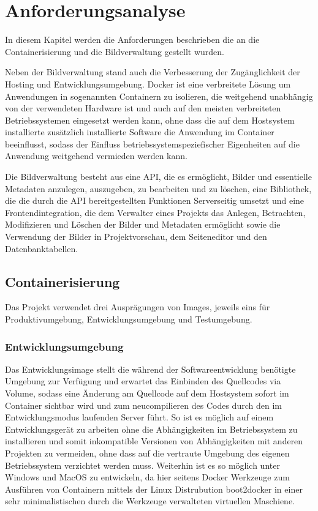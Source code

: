 \section{Anforderungsanalyse}
\label{sec:requirements}

In diesem Kapitel werden die Anforderungen beschrieben die an die
Containerisierung und die Bildverwaltung gestellt wurden.

Neben der Bildverwaltung stand auch die Verbesserung der Zugänglichkeit der
Hosting und Entwicklungsumgebung. Docker ist eine verbreitete Lösung um
Anwendungen in sogenannten Containern zu isolieren, die weitgehend
unabhängig von der verwendeten Hardware ist und auch auf den meisten
verbreiteten Betriebssystemen eingesetzt werden kann, ohne dass die auf dem
Hostsystem installierte zusätzlich installierte Software die Anwendung im
Container beeinflusst, sodass der Einfluss betriebssystemspeziefischer
Eigenheiten auf die Anwendung weitgehend vermieden werden kann.

Die Bildverwaltung besteht aus eine API, die es ermöglicht, Bilder und
essentielle Metadaten anzulegen, auszugeben, zu bearbeiten und zu löschen, eine
Bibliothek, die die durch die API bereitgestellten Funktionen Serverseitig
umsetzt und eine Frontendintegration, die dem Verwalter eines Projekts das
Anlegen, Betrachten, Modifizieren und Löschen der Bilder und Metadaten
ermöglicht sowie die Verwendung der Bilder in Projektvorschau, dem Seiteneditor
und den Datenbanktabellen.

\subsection{Containerisierung}

Das Projekt verwendet drei Ausprägungen von Images, jeweils eins für
Produktivumgebung, Entwicklungsumgebung und Testumgebung.

\subsubsection{Entwicklungsumgebung}

Das Entwicklungsimage stellt die während der Softwareentwicklung
benötigte Umgebung zur Verfügung und erwartet das Einbinden des
Quellcodes via Volume, sodass eine Änderung am Quellcode auf dem Hostsystem
sofort im Container sichtbar wird und zum neucompilieren des Codes durch den im
Entwicklungsmodus laufenden Server führt. So ist es möglich auf einem
Entwicklungsgerät zu arbeiten ohne die Abhängigkeiten im Betriebssystem
zu installieren und somit inkompatible Versionen von Abhängigkeiten mit
anderen Projekten zu vermeiden, ohne dass auf die vertraute Umgebung des eigenen
Betriebssystem verzichtet werden muss. Weiterhin ist es so möglich unter Windows
und MacOS zu entwickeln, da hier seitens Docker Werkzeuge zum Ausführen von
Containern mittels der Linux Distrubution boot2docker in einer sehr
minimalistischen durch die Werkzeuge verwalteten virtuellen Maschiene.


